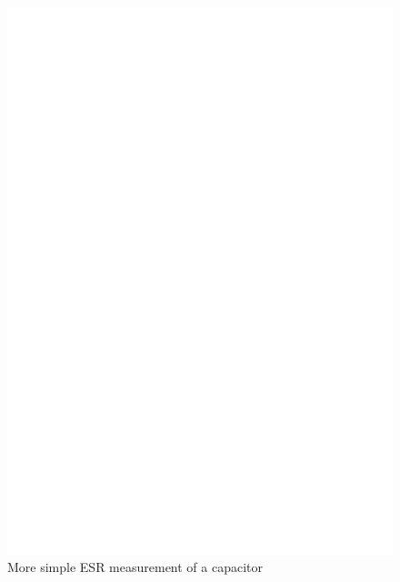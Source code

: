 \begin{figure}[H]
  \centering
    \includegraphics[]{../FIG/Cap_esr2.eps}
  \caption{More simple ESR measurement of a capacitor}
  \label{fig:Cap_esr2}
\end{figure}


